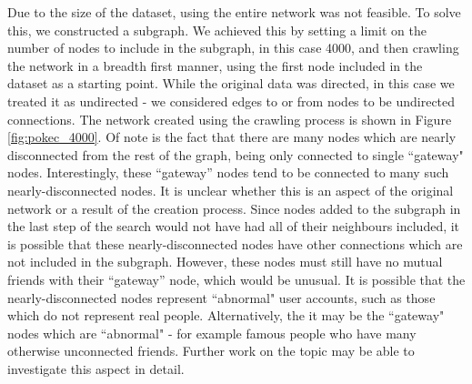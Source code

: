\documentclass[bsc,frontabs,twoside,singlespacing,parskip,deptreport]{infthesis}     %
\begin{document}
Due to the size of the dataset, using the entire network was not feasible. To solve this, we constructed a subgraph. We achieved this by setting a limit on the number of nodes to include in the subgraph, in this case 4000, and then crawling the network in a breadth first manner, using the first node included in the dataset as a starting point. While the original data was directed, in this case we treated it as undirected - we considered edges to or from nodes to be undirected connections. The network created using the crawling process is shown in Figure \ref{fig:pokec_4000}. Of note is the fact that there are many nodes which are nearly disconnected from the rest of the graph, being only connected to single ``gateway" nodes. Interestingly, these ``gateway'' nodes tend to be connected to many such nearly-disconnected nodes. It is unclear whether this is an aspect of the original network or a result of the creation process. Since nodes added to the subgraph in the last step of the search would not have had all of their neighbours included, it is possible that these nearly-disconnected nodes have other connections which are not included in the subgraph. However, these nodes must still have no mutual friends with their ``gateway'' node, which would be unusual. It is possible that the nearly-disconnected nodes represent ``abnormal" user accounts, such as those which do not represent real people. Alternatively, the it may be the ``gateway" nodes which are ``abnormal" - for example famous people who have many otherwise unconnected friends. Further work on the topic may be able to investigate this aspect in detail.
\end{document}
